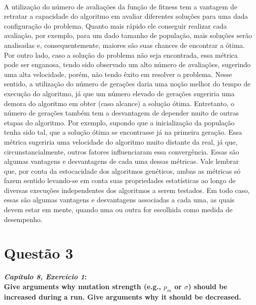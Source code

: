 \documentclass{report}
\begin{document}
\paragraph{} A utilização do número de avaliações da função de fitness tem a vantagem de retratar a capacidade do algoritmo em avaliar diferentes soluções para uma dada configuração do problema. Quanto mais rápido ele conseguir realizar cada avaliação, por exemplo, para um dado tamanho de população, mais soluções serão analisadas e, consequentemente, maiores são suas chances de encontrar a ótima. Por outro lado, caso a solução do problema não seja encontrada, essa métrica pode ser enganosa, tendo sido observado um alto número de avaliações, sugerindo uma alta velocidade, porém, não tendo êxito em resolver o problema. Nesse sentido, a utilização do número de gerações daria uma noção melhor do tempo de execução do algoritmo, já que um número elevado de gerações sugeriria uma demora do algoritmo em obter (caso alcance) a solução ótima. Entretanto, o número de gerações também tem a desvantagem de depender muito de outras etapas do algoritmo. Por exemplo, supondo que a inicialização da população tenha sido tal, que a solução ótima se encontrasse já na primeira geração. Essa métrica sugeriria uma velocidade do algoritmo muito distante da real, já que, circunstancialmente, outros fatores influenciaram essa convergência. Essas são algumas vantagens e desvantagens de cada uma dessas métricas. Vale lembrar que, por conta da estocacidade dos algoritmos genéticos, ambas as métricas só fazem sentido levando-se em conta suas propriedades estatísticas ao longo de diversas execuções independentes dos algoritmos a serem testados. Em todo caso, essas são algumas vantagens e desvantagens associadas a cada uma, as quais devem estar em mente, quando uma ou outra for escolhida como medida de desempenho. \\

\section*{Questão 3}

\textbf{\textit{Capítulo 8, Exercício 1}:}\\

\textbf{Give arguments why mutation strength (e.g., $p_m$ or $\sigma$) should be increased during a run. Give arguments why it should be decreased.}\\

\paragraph{}
\end{document}
